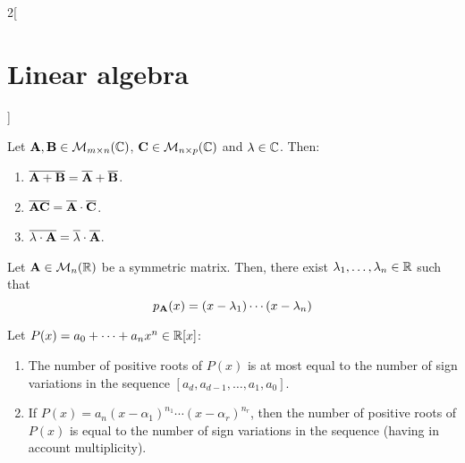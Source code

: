 \documentclass[../../../main.tex]{subfiles}
\begin{document}
\begin{multicols}{2}[\section{Linear algebra}]
\begin{prop}
    Let $\vb{A},\vb{B}\in\mathcal{M}_{m\times n}(\mathbb{C})$, $\vb{C}\in\mathcal{M}_{n\times p}(\mathbb{C})$ and $\lambda\in\mathbb{C}$. Then:
    \begin{enumerate}
      \item $\overline{\vb{A}+\vb{B}}=\overline{\vb{A}}+\overline{\vb{B}}$.
      \item $\overline{\vb{A}\vb{C}}=\overline{\vb{A}}\cdot\overline{\vb{C}}$.
      \item $\overline{\lambda\cdot\vb{A}}=\overline{\lambda}\cdot\overline{\vb{A}}$.
    \end{enumerate}
  \end{prop}
  \begin{corollary}
    Let $\vb{A}\in\mathcal{M}_n(\mathbb{R})$ be a symmetric matrix. Then, there exist $\lambda_1,\ldots,\lambda_n\in\mathbb{R}$ such that $$p_{\vb{A}}(x)=(x-\lambda_1 )\cdots(x-\lambda_n)$$
  \end{corollary}
  \begin{theorem}
    Let $P(x)=a_0+\cdots+a_nx^n\in\mathbb{R}[x]$:
    \begin{enumerate}
      \item The number of positive roots of $P(x)$ is at most equal to the number of sign variations in the sequence $[a_d,a_{d-1},\ldots,a_1,a_0]$.
      \item If $P(x)=a_n(x-\alpha_1)^{n_1}\cdots(x-\alpha_r)^{n_r}$, then the number of positive roots of $P(x)$ is equal to the number of sign variations in the sequence (having in account multiplicity).
    \end{enumerate}
  \end{theorem}
\end{multicols}
\end{document}
